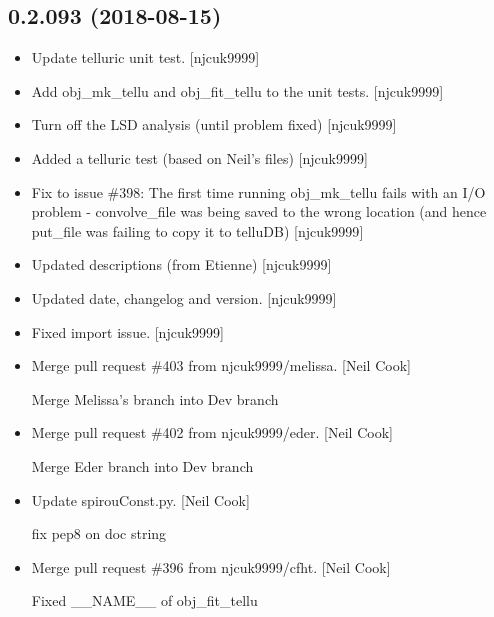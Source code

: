 \documentclass[a4paper,10pt,english]{report}
\begin{document}
\subsection{0.2.093 (2018-08-15)}
\label{\detokenize{misc/changelog:id367}}\begin{itemize}
\item {} 
Update telluric unit test. {[}njcuk9999{]}

\item {} 
Add obj\_mk\_tellu and obj\_fit\_tellu to the unit tests. {[}njcuk9999{]}

\item {} 
Turn off the LSD analysis (until problem fixed) {[}njcuk9999{]}

\item {} 
Added a telluric test (based on Neil’s files) {[}njcuk9999{]}

\item {} 
Fix to issue \#398: The first time running obj\_mk\_tellu fails with an
I/O problem - convolve\_file was being saved to the wrong location (and
hence put\_file was failing to copy it to telluDB) {[}njcuk9999{]}

\item {} 
Updated descriptions (from Etienne) {[}njcuk9999{]}

\item {} 
Updated date, changelog and version. {[}njcuk9999{]}

\item {} 
Fixed import issue. {[}njcuk9999{]}

\item {} 
Merge pull request \#403 from njcuk9999/melissa. {[}Neil Cook{]}

Merge Melissa’s branch into Dev branch

\item {} 
Merge pull request \#402 from njcuk9999/eder. {[}Neil Cook{]}

Merge Eder branch into Dev branch

\item {} 
Update spirouConst.py. {[}Neil Cook{]}

fix pep8 on doc string

\item {} 
Merge pull request \#396 from njcuk9999/cfht. {[}Neil Cook{]}

Fixed \_\_NAME\_\_ of obj\_fit\_tellu

\end{itemize}
\end{document}

